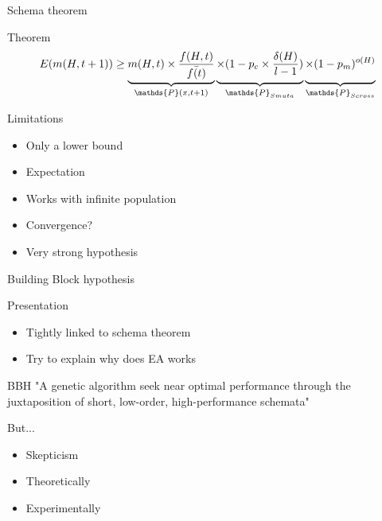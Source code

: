 \begin{frame}{Schema theorem}
  \begin{block}{Theorem}
    $$E(m(H,t+1)) \geq \underbrace{m(H,t) \times \frac{f(H,t)}{\bar{f(t)}}}_{\mathds{P}(x,t+1)}
    \underbrace{\times (1 - p_c \times \frac{\delta(H)}{l-1})\vphantom{\frac{f(H,t)}{\bar{f(t)}}}}_{\mathds{P}_{Smuta}}
    \underbrace{\times (1 - p_m)^{o(H)}\vphantom{\frac{f(H,t)}{\bar{f(t)}}}}_{\mathds{P}_{Scross}}$$
  \end{block}

  \begin{block}{Limitations}
    \begin{itemize}
      \item Only a lower bound
      \item Expectation
      \item Works with infinite population
      \item Convergence?
      \item Very strong hypothesis
    \end{itemize}
  \end{block}
\end{frame}

\begin{frame}{Building Block hypothesis}
  \begin{block}{Presentation}
    \begin{itemize}
    \item Tightly linked to schema theorem
    \item Try to explain why does EA works
    \end{itemize}
  \end{block}

  \begin{block}{BBH}
    "A genetic algorithm seek near optimal performance through the juxtaposition of short, low-order, high-performance schemata"\cite{goldberg1989}
  \end{block}

  \begin{block}{But...}
    \begin{itemize}
      \item Skepticism
      \item Theoretically\cite{wright2003}
      \item Experimentally\cite{forrest1993}
    \end{itemize}
  \end{block}
\end{frame}

